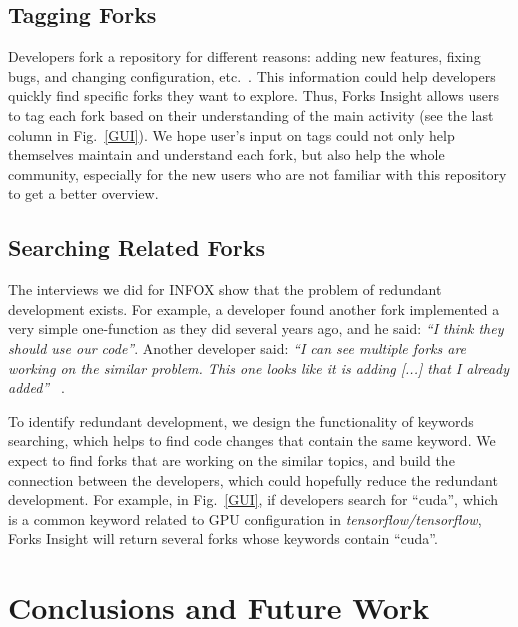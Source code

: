 \subsection{Tagging Forks}
%
Developers fork a repository for different reasons: adding new features, fixing bugs, and changing configuration, etc.~\cite{Mikkonen2011,Robles2012,dubinsky2013exploratory,stanciulescu2015forked}. This information could help developers quickly find specific forks they want to explore. Thus, Forks Insight allows users to tag each fork based on their understanding of the main activity (see the last column in Fig.~\ref{GUI}). We hope user's input on tags could not only help themselves maintain and understand each fork, but also help the whole community, especially for the new users who are not familiar with this repository to get a better overview. 


\subsection{Searching Related Forks}
The interviews we did for INFOX show that the problem of redundant development exists. For example, a developer found another fork implemented a very simple one-function as they did several years ago, and he said: \emph{``I think they should use our code''}. Another developer said: \emph{``I can see multiple forks are working on the similar problem. This one looks like it is adding [...] that I already added''} ~\cite{ZSLXWK:ICSE18}.

To identify redundant development, we design the functionality of keywords searching, which helps to find code changes that contain the same keyword. We expect to find forks that are working on the similar topics, and build the connection between the developers, which could hopefully reduce the redundant development. For example, in Fig.~\ref{GUI}, if developers search for ``cuda'', which is a common keyword related to GPU configuration in \emph{tensorflow/tensorflow}, Forks Insight will return several forks whose keywords contain ``cuda''.
\iffalse
\begin{figure}[H] 
\centering
\texttt{[image: shot2.png]}
\caption{An example of searching for similar forks.}
\vspace{-10pt}

\end{figure}
\fi

\section{Conclusions and Future Work}

